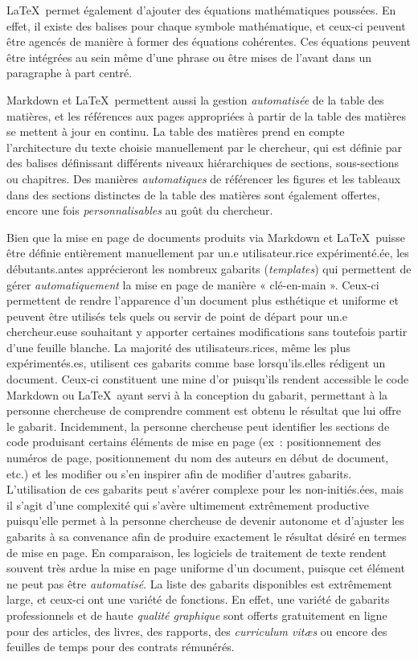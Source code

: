 \documentclass[
  letterpaper,
]{scrbook}
\begin{document}
\LaTeX~permet également d'ajouter des équations mathématiques poussées.
En effet, il existe des balises pour chaque symbole mathématique, et
ceux-ci peuvent être agencés de manière à former des équations
cohérentes. Ces équations peuvent être intégrées au sein même d'une
phrase ou être mises de l'avant dans un paragraphe à part centré.

Markdown et \LaTeX~permettent aussi la gestion \emph{automatisée} de la
table des matières, et les références aux pages appropriées à partir de
la table des matières se mettent à jour en continu. La table des
matières prend en compte l'architecture du texte choisie manuellement
par le chercheur, qui est définie par des balises définissant différents
niveaux hiérarchiques de sections, sous-sections ou chapitres. Des
manières \emph{automatiques} de référencer les figures et les tableaux
dans des sections distinctes de la table des matières sont également
offertes, encore une fois \emph{personnalisables} au goût du chercheur.

Bien que la mise en page de documents produits via Markdown et
\LaTeX~puisse être définie entièrement manuellement par un.e
utilisateur.rice expérimenté.ée, les débutants.antes apprécieront les
nombreux gabarits (\emph{templates}) qui permettent de gérer
\emph{automatiquement} la mise en page de manière « clé-en-main ».
Ceux-ci permettent de rendre l'apparence d'un document plus esthétique
et uniforme et peuvent être utilisés tels quels ou servir de point de
départ pour un.e chercheur.euse souhaitant y apporter certaines
modifications sans toutefois partir d'une feuille blanche. La majorité
des utilisateurs.rices, même les plus expérimentés.es, utilisent ces
gabarits comme base lorsqu'ils.elles rédigent un document. Ceux-ci
constituent une mine d'or puisqu'ils rendent accessible le code Markdown
ou \LaTeX~ayant servi à la conception du gabarit, permettant à la
personne chercheuse de comprendre comment est obtenu le résultat que lui
offre le gabarit. Incidemment, la personne chercheuse peut identifier
les sections de code produisant certains éléments de mise en page (ex~:
positionnement des numéros de page, positionnement du nom des auteurs en
début de document, etc.) et les modifier ou s'en inspirer afin de
modifier d'autres gabarits. L'utilisation de ces gabarits peut s'avérer
complexe pour les non-initiés.ées, mais il s'agit d'une complexité qui
s'avère ultimement extrêmement productive puisqu'elle permet à la
personne chercheuse de devenir autonome et d'ajuster les gabarits à sa
convenance afin de produire exactement le résultat désiré en termes de
mise en page. En comparaison, les logiciels de traitement de texte
rendent souvent très ardue la mise en page uniforme d'un document,
puisque cet élément ne peut pas être \emph{automatisé}. La liste des
gabarits disponibles est extrêmement large, et ceux-ci ont une variété
de fonctions. En effet, une variété de gabarits professionnels et de
haute \emph{qualité graphique} sont offerts gratuitement en ligne pour
des articles, des livres, des rapports, des \emph{curriculum vitæs} ou
encore des feuilles de temps pour des contrats rémunérés.
\end{document}
